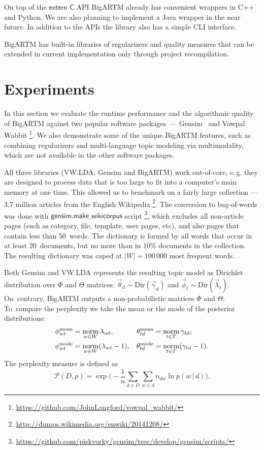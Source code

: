 \documentclass[russian,english]{llncs}
\newcommand{\norm}{\mathop{\rm norm}\limits}
\newcommand{\cond}{\mspace{3mu}{|}\mspace{3mu}}
\newcommand{\kw}[1]{\textsf{#1}}
\begin{document}
On top of the $\kw{extern C}$ API BigARTM already has convenient wrappers in C++ and Python.
We are also planning to implement a Java wrapper in the near future.
In addition to the APIs the library also has a simple CLI interface.

BigARTM has built-in libraries of regularizers and quality measures
that can be extended in current implementation only through project recompilation.

\section{Experiments}
\label{sec:Experiments}

In this section we evaluate the runtime performance and the algorithmic quality of \mbox{BigARTM}
against two popular software packages~---
Gensim~\cite{rehurek10software}
and Vowpal Wabbit%
\footnote{\url{https://github.com/JohnLangford/vowpal_wabbit/}}.
We also demonstrate some of the unique BigARTM features, such as
combining regularizers and multi-language topic modeling via multimodality,
which are not available in the other software packages.

All three libraries (VW.LDA, Gensim and BigARTM) work out-of-core,
e.\,g. they are designed to process data that is too large to fit into a computer's main memory at one time.
This allowed us to benchmark on a fairly large collection --- 3.7 million articles from the English Wikipedia%
\footnote{\url{http://dumps.wikimedia.org/enwiki/20141208/}}.
The conversion to bag-of-words was done with $\kw{gensim.make\_wikicorpus}$ script%
\footnote{\url{https://github.com/piskvorky/gensim/tree/develop/gensim/scripts/}},
which excludes all non-article pages (such as category, file, template, user pages, etc),
and also pages that contain less than $50$~words.
The dictionary is formed by all words that occur in at least 20~documents,
but no more than in $10\%$ documents in the collection.
The resulting dictionary was caped at $|W| = 100\,000$ most frequent words.

Both Gensim and VW.LDA represents the resulting topic model as Dirichlet distribution over $\Phi$ and $\Theta$ matrices:
${\vec\theta}_{d} \sim \text{Dir}({\vec\gamma}_d)$ and
${\vec\phi}_{t} \sim \text{Dir}({\vec\lambda}_t)$.
On~contrary, BigARTM outputs a non-probabilistic matrices $\Phi$ and $\Theta$.
To~compare the perplexity we take the mean or the mode of the posterior distributions:
\begin{align*}
    \phi^{\mathrm{mean}}_{wt} &= \norm_{w\in W} \lambda_{wt}, &
	\theta^{\mathrm{mean}}_{td} &= \norm_{t\in T} \gamma_{td};
\\
    \phi^{\mathrm{mode}}_{wt} &= \norm_{w\in W} (\lambda_{wt}-1), &
	\theta^{\mathrm{mode}}_{td} &= \norm_{t\in T} (\gamma_{td}-1).
\end{align*}
The perplexity measure is defined as
\begin{equation}
    \label{eq:perplexity}
    \mathscr{P}(D, p) =
        \exp \biggl( - \frac{1}{n} \sum_{d \in D} \sum_{w \in d} n_{dw} \ln p(w \cond d) \biggr).
\end{equation}
\end{document}
